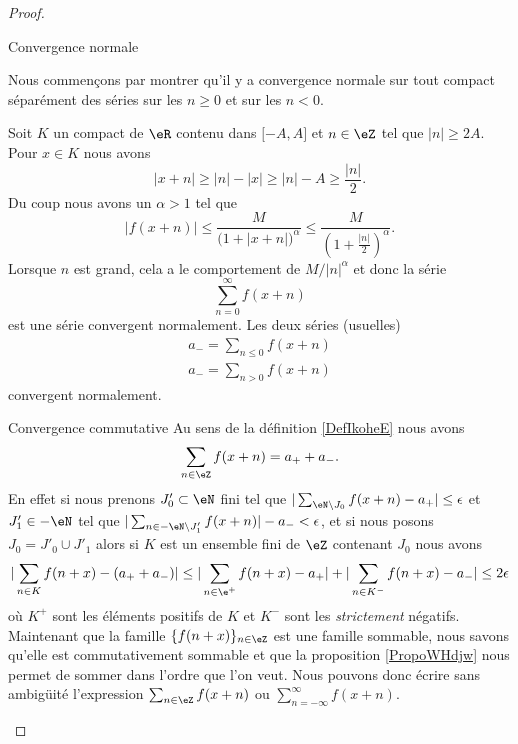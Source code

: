 \begin{proof}
    \begin{subproof}
        \item[Convergence normale]

    
    Nous commençons par montrer qu'il y a convergence normale sur tout compact séparément des séries sur les \( n\geq 0\) et sur les \( n<0\).
    
    Soit \( K\) un compact de \( \eR\) contenu dans \( \mathopen[ -A , A \mathclose]\) et \( n\in \eZ\) tel que \( | n |\geq 2A\). Pour \( x\in K\) nous avons
    \begin{equation}
        | x+n |\geq | n |-| x |\geq | n |-A\geq \frac{ | n | }{ 2 }.
    \end{equation}
    Du coup nous avons un \( \alpha>1\) tel que
    \begin{equation}
        | f(x+n) |\leq \frac{ M }{ \big( 1+| x+n | \big)^{\alpha} }\leq \frac{ M }{ \left( 1+\frac{ | n | }{2} \right)^{\alpha} }.
    \end{equation}
    Lorsque \( n\) est grand, cela a le comportement de \( M/| n |^{\alpha}\) et donc la série
    \begin{equation}
        \sum_{n=0}^{\infty}f(x+n)
    \end{equation}
    est une série convergent normalement. Les deux séries (usuelles) 
    \begin{subequations}
        \begin{align}
            a_-=\sum_{n\leq 0}f(x+n)\\
            a_-=\sum_{n> 0}f(x+n)
        \end{align}
    \end{subequations}
    convergent normalement.
    
\item[Convergence commutative]
    Au sens de la définition \ref{DefIkoheE} nous avons
    \begin{equation}
        \sum_{n\in \eZ}f(x+n)=a_++a_-.
    \end{equation}
    En effet si nous prenons \( J'_0\subset\eN\) fini tel que \( |\sum_{\eN\setminus J_0}f(x+n)-a_+|\leq \epsilon\) et \( J'_1\in -\eN\) tel que \( |\sum_{n\in -\eN\setminus J'_1}f(x+n)|-a_-<\epsilon\), et si nous posons \( J_0=J'_0\cup J'_1\) alors si \( K\) est un ensemble fini de \( \eZ\) contenant \( J_0\) nous avons
    \begin{equation}
        | \sum_{n\in K}f(n+x)-(a_++a_-) |\leq | \sum_{n\in \e^+}f(n+x)-a_+ |+| \sum_{n\in K^-}f(n+x)-a_- |\leq 2\epsilon
    \end{equation}
    où $K^+$ sont les éléments positifs de \(K\) et \( K^-\) sont les \emph{strictement} négatifs. Maintenant que la famille \( \{ f(n+x) \}_{n\in \eZ}\) est une famille sommable, nous savons qu'elle est commutativement sommable et que la proposition \ref{PropoWHdjw} nous permet de sommer dans l'ordre que l'on veut. Nous pouvons donc écrire sans ambigüité l'expression \( \sum_{n\in \eZ}f(x+n)\) ou \( \sum_{n=-\infty}^{\infty}f(x+n)\).
    

\end{subproof}
\end{proof}
